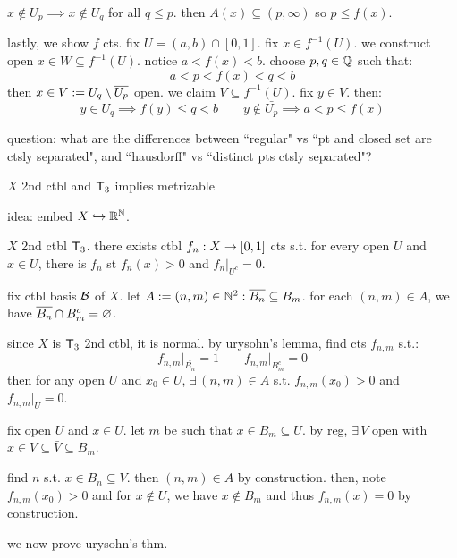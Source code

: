 \begin{pf}[source=Primary Source Material]
\begin{block}
        $x\notin U_{p}\implies x\notin U_{q}$ for all $q\leq p$.
        then $A(x)\subseteq(p,\infty)$ so $p\leq f(x)$.
    \end{block}
    lastly, we show $f$ cts. fix $U=(a,b)\cap[0,1]$.
    fix $x\in f^{-1}(U)$. we construct open $x\in W\subseteq f^{-1}(U)$.
    notice $a<f(x)<b$. choose $p,q\in\mathbb{Q}$ such that:
    \begin{equation*}
        a<p<f(x)<q<b
    \end{equation*}
    then $x\in V:=U_{q}\setminus\overline{U_{p}}$ open. we claim $V\subseteq f^{-1}(U)$.
    fix $y\in V$. then:
    \begin{equation*}
        y\in U_{q}\implies f(y)\leq q<b \qquad
        y\notin\bar{U_{p}}\implies a<p\leq f(x)
    \end{equation*} \vspace{-3mm}
\end{pf}
question: what are the differences between ``regular" vs ``pt and closed set are
ctsly separated", and ``hausdorff" vs ``distinct pts ctsly separated"?

\begin{thm}[title=Urysohn's Metrization Theorem]
    $X$ 2nd ctbl and $\mathsf{T}_{3}$ implies metrizable
\end{thm}
\vspace{-2.5mm}
idea: embed $X\hookrightarrow\mathbb{R}^{\mathbb{N}}$.
\vspace{2.5mm}

\begin{lm}
    $X$ 2nd ctbl $\mathsf{T}_{3}$.
    there exists ctbl $f_{n}:X\rightarrow[0,1]$ cts s.t. for every open $U$ and
    $x\in U$, there is $f_{n}$ st $f_{n}(x)>0$ and $f_{n}\rvert_{U^{c}}=0$.
\end{lm}

\begin{pf}[source=Primary Source Material]
    fix ctbl basis $\mathcal{B}$ of $X$.
    let $A:=(n,m)\in\mathbb{N}^{2}:\overline{B_{n}}\subseteq B_{m}$.
    for each $(n,m)\in A$, we have $\overline{B_{n}}\cap B_{m}^{c}=\varnothing$.

    since $X$ is $\mathsf{T}_{3}$ 2nd ctbl, it is normal.
    by urysohn's lemma, find cts $f_{n,m}$ s.t.:
    \begin{equation*}
        f_{n,m}\rvert_{\bar{B_{n}}}=1 \qquad
        f_{n,m}\rvert_{B_{m}^{c}}=0
    \end{equation*}
    then for any open $U$ and $x_{0}\in U$, $\exists \, (n,m)\in A$ s.t.
    $f_{n,m}(x_{0})>0$ and $f_{n,m}\rvert_{U}=0$.
    \begin{block}
        fix open $U$ and $x\in U$.
        let $m$ be such that $x\in B_{m}\subseteq U$.
        by reg, $\exists \, V$ open with $x\in V\subseteq\bar{V}\subseteq B_{m}$.

        find $n$ s.t. $x\in B_{n}\subseteq V$. then $(n,m)\in A$ by construction.
        then, note $f_{n,m}(x_{0})>0$ and for $x\notin U$, we have
        $x\notin B_{m}$ and thus $f_{n,m}(x)=0$ by construction.
    \end{block}
\end{pf}
we now prove urysohn's thm.


